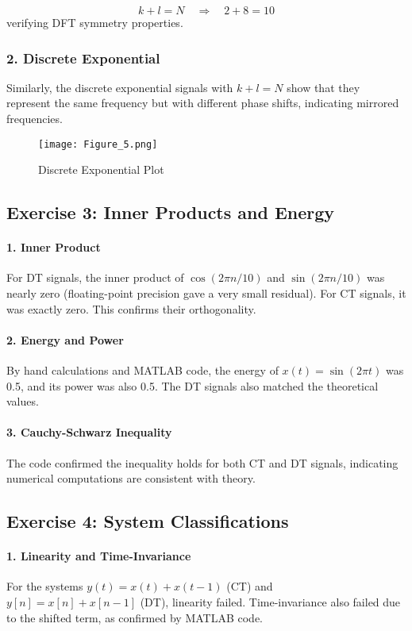 \documentclass[12pt]{article}
\begin{document}
\[
k + l = N \quad \Rightarrow \quad 2 + 8 = 10
\]
verifying DFT symmetry properties.

\subsubsection{2. Discrete Exponential}
Similarly, the discrete exponential signals with \(k + l = N\) show that they represent the same frequency but with different phase shifts, indicating mirrored frequencies.
\begin{figure}[h]
    \centering
    \texttt{[image: Figure\_5.png]}
    \caption{Discrete Exponential Plot}
    \label{fig:discrete exponential}
\end{figure}

\subsection{Exercise 3: Inner Products and Energy}

\paragraph{1. Inner Product}
For DT signals, the inner product of \(\cos(2\pi n/10)\) and \(\sin(2\pi n/10)\) was nearly zero (floating-point precision gave a very small residual). For CT signals, it was exactly zero. This confirms their orthogonality.

\paragraph{2. Energy and Power}
By hand calculations and MATLAB code, the energy of \(x(t) = \sin(2\pi t)\) was 0.5, and its power was also 0.5. The DT signals also matched the theoretical values. 

\paragraph{3. Cauchy-Schwarz Inequality}
The code confirmed the inequality holds for both CT and DT signals, indicating numerical computations are consistent with theory.

\subsection{Exercise 4: System Classifications}

\paragraph{1. Linearity and Time-Invariance}
For the systems \(y(t) = x(t) + x(t - 1)\) (CT) and \(y[n] = x[n] + x[n - 1]\) (DT), linearity failed. Time-invariance also failed due to the shifted term, as confirmed by MATLAB code.
\end{document}
